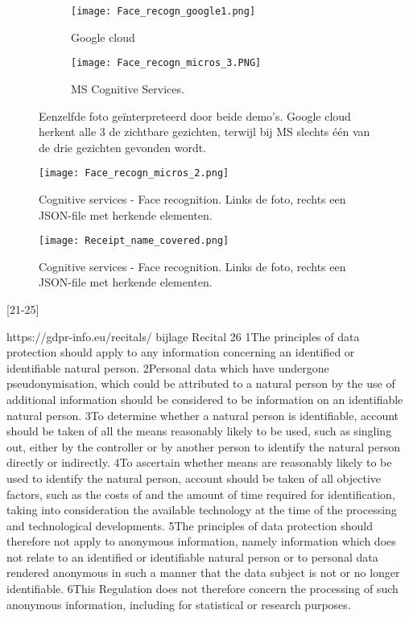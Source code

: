 \begin{figure}[h]
	\centering
	\begin{subfigure}{0.45\textwidth}
		\centering
		\texttt{[image: Face\_recogn\_google1.png]}
		\caption{Google cloud}
		\label{fig:sub1}
	\end{subfigure}%
	\begin{subfigure}{0.45\textwidth}
		\centering
		\texttt{[image: Face\_recogn\_micros\_3.PNG]}
		\caption{MS Cognitive Services.}
		\label{fig:sub2}
	\end{subfigure}
	\caption{Eenzelfde foto geïnterpreteerd door beide demo's. Google cloud herkent alle 3 de zichtbare gezichten, terwijl bij MS slechts één van de drie gezichten gevonden wordt.}
	\label{fig:test}
\end{figure}

\begin{figure}[h]
	\texttt{[image: Face\_recogn\_micros\_2.png]}
	\caption{Cognitive services - Face recognition. Links de foto, rechts een JSON-file met herkende elementen.}
	\label{fig:cognitive2}
\end{figure}

\begin{figure}[h]
	\texttt{[image: Receipt\_name\_covered.png]}
	\caption{Cognitive services - Face recognition. Links de foto, rechts een JSON-file met herkende elementen.}
	\label{fig:receipt}
\end{figure}

[21-25]




https://gdpr-info.eu/recitals/ bijlage
Recital 26
1The principles of data protection should apply to any information concerning an identified or identifiable natural person. 2Personal data which have undergone pseudonymisation, which could be attributed to a natural person by the use of additional information should be considered to be information on an identifiable natural person. 3To determine whether a natural person is identifiable, account should be taken of all the means reasonably likely to be used, such as singling out, either by the controller or by another person to identify the natural person directly or indirectly. 4To ascertain whether means are reasonably likely to be used to identify the natural person, account should be taken of all objective factors, such as the costs of and the amount of time required for identification, taking into consideration the available technology at the time of the processing and technological developments. 5The principles of data protection should therefore not apply to anonymous information, namely information which does not relate to an identified or identifiable natural person or to personal data rendered anonymous in such a manner that the data subject is not or no longer identifiable. 6This Regulation does not therefore concern the processing of such anonymous information, including for statistical or research purposes.

